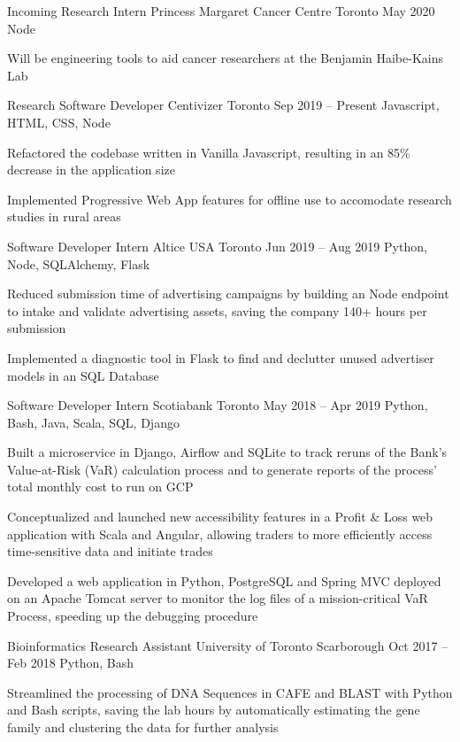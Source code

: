 \begin{cventries}
  \cventry
    {Incoming Research Intern}
    {Princess Margaret Cancer Centre}
    {Toronto}
    {May 2020}
    {Node}
    {
      \begin{cvitems}
        \item {Will be engineering tools to aid cancer researchers at the Benjamin Haibe-Kains Lab}
      \end{cvitems}
    }
  \cventry
    {Research Software Developer}
    {Centivizer}
    {Toronto}
    {Sep 2019 -- Present}
    {Javascript, HTML, CSS, Node}
    {
      \begin{cvitems}
        \item {Refactored the codebase written in Vanilla Javascript, resulting in an 85\% decrease in the application size}
        \item {Implemented Progressive Web App features for offline use to accomodate research studies in rural areas}
      \end{cvitems}
    }
  \cventry
    {Software Developer Intern}
    {Altice USA}
    {Toronto}
    {Jun 2019 -- Aug 2019}
    {Python, Node, SQLAlchemy, Flask}
    {
    \begin{cvitems}
      \item {Reduced submission time of advertising campaigns by building an Node endpoint to intake and validate advertising assets, saving the company 140+ hours per submission}
      \item {Implemented a diagnostic tool in Flask to find and declutter unused advertiser models in an SQL Database}
    \end{cvitems}
    }
  \cventry
    {Software Developer Intern}
    {Scotiabank}
    {Toronto}
    {May 2018 -- Apr 2019}
    {Python, Bash, Java, Scala, SQL, Django}
    {
      \begin{cvitems}
        \item {Built a microservice in Django, Airflow and SQLite to track reruns of the Bank's Value-at-Risk (VaR) calculation process and to generate reports of the process' total monthly cost to run on GCP}
        \item {Conceptualized and launched new accessibility features in a Profit \& Loss web application with Scala and Angular, allowing traders to more efficiently access time-sensitive data and initiate trades}
        \item {Developed a web application in Python, PostgreSQL and Spring MVC deployed on an Apache Tomcat server to monitor the log files of a mission-critical VaR Process, speeding up the debugging procedure}
      \end{cvitems}
    }
  
  \cventry
    {Bioinformatics Research Assistant}
    {University of Toronto}
    {Scarborough}
    {Oct 2017 -- Feb 2018}
    {Python, Bash}
    {
      \begin{cvitems}
        \item {Streamlined the processing of DNA Sequences in CAFE and BLAST with Python and Bash scripts, saving the lab hours by automatically estimating the gene family and clustering the data for further analysis}
      \end{cvitems}
    }
\end{cventries}
